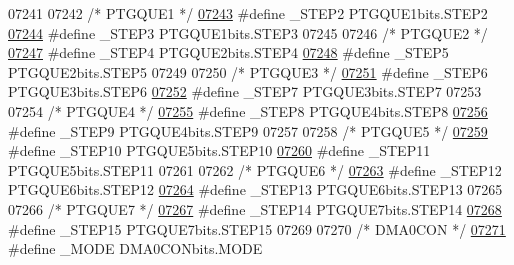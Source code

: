 \begin{DoxyCode}
07241 
07242 \textcolor{comment}{/* PTGQUE1 */}
\hypertarget{a00009_source_l07243}{}\hyperlink{a00009_ab7a038de94f59ad711958205c6e9a802}{07243} \textcolor{preprocessor}{#define \_STEP2 PTGQUE1bits.STEP2}
\hypertarget{a00009_source_l07244}{}\hyperlink{a00009_aa905cce9d90af5accde9b581065fcd9b}{07244} \textcolor{preprocessor}{#define \_STEP3 PTGQUE1bits.STEP3}
07245 
07246 \textcolor{comment}{/* PTGQUE2 */}
\hypertarget{a00009_source_l07247}{}\hyperlink{a00009_acb9583d0b0ccc8b7f1cb05f77205b915}{07247} \textcolor{preprocessor}{#define \_STEP4 PTGQUE2bits.STEP4}
\hypertarget{a00009_source_l07248}{}\hyperlink{a00009_a0d9d2c77a3255e72af295a4bf2dd64ba}{07248} \textcolor{preprocessor}{#define \_STEP5 PTGQUE2bits.STEP5}
07249 
07250 \textcolor{comment}{/* PTGQUE3 */}
\hypertarget{a00009_source_l07251}{}\hyperlink{a00009_a60c17842bb1a2939fb85cbc567247543}{07251} \textcolor{preprocessor}{#define \_STEP6 PTGQUE3bits.STEP6}
\hypertarget{a00009_source_l07252}{}\hyperlink{a00009_a5fae31d50ad75e8e2c87ec2063e0efc2}{07252} \textcolor{preprocessor}{#define \_STEP7 PTGQUE3bits.STEP7}
07253 
07254 \textcolor{comment}{/* PTGQUE4 */}
\hypertarget{a00009_source_l07255}{}\hyperlink{a00009_a7b120a582184254b0ada22d9cb5e9aca}{07255} \textcolor{preprocessor}{#define \_STEP8 PTGQUE4bits.STEP8}
\hypertarget{a00009_source_l07256}{}\hyperlink{a00009_a26e236085a7aba41176efa04dbfd2bdb}{07256} \textcolor{preprocessor}{#define \_STEP9 PTGQUE4bits.STEP9}
07257 
07258 \textcolor{comment}{/* PTGQUE5 */}
\hypertarget{a00009_source_l07259}{}\hyperlink{a00009_a44501756b31d4b84ffb1e84e6c78ed77}{07259} \textcolor{preprocessor}{#define \_STEP10 PTGQUE5bits.STEP10}
\hypertarget{a00009_source_l07260}{}\hyperlink{a00009_a3ded52fe347b337ea54904ba0a4fa695}{07260} \textcolor{preprocessor}{#define \_STEP11 PTGQUE5bits.STEP11}
07261 
07262 \textcolor{comment}{/* PTGQUE6 */}
\hypertarget{a00009_source_l07263}{}\hyperlink{a00009_a876b48df506e436af53df7844f5b9517}{07263} \textcolor{preprocessor}{#define \_STEP12 PTGQUE6bits.STEP12}
\hypertarget{a00009_source_l07264}{}\hyperlink{a00009_aedf63b0bd35e358513bf8f204ad38411}{07264} \textcolor{preprocessor}{#define \_STEP13 PTGQUE6bits.STEP13}
07265 
07266 \textcolor{comment}{/* PTGQUE7 */}
\hypertarget{a00009_source_l07267}{}\hyperlink{a00009_aa077f76695912abe8ec9a710d72f0b6e}{07267} \textcolor{preprocessor}{#define \_STEP14 PTGQUE7bits.STEP14}
\hypertarget{a00009_source_l07268}{}\hyperlink{a00009_ac8e8bafb4db0d451ab06a7caf8ed29f1}{07268} \textcolor{preprocessor}{#define \_STEP15 PTGQUE7bits.STEP15}
07269 
07270 \textcolor{comment}{/* DMA0CON */}
\hypertarget{a00009_source_l07271}{}\hyperlink{a00009_a37a6b31e7f35f6eacbc56a606040fc29}{07271} \textcolor{preprocessor}{#define \_MODE DMA0CONbits.MODE}

\end{DoxyCode}
